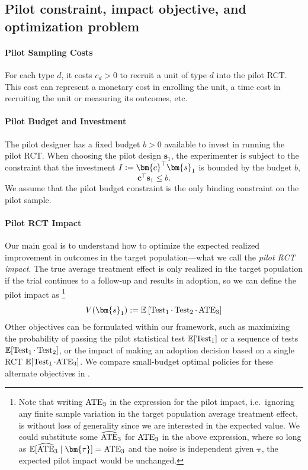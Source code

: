 \subsection{Pilot constraint, impact objective, and optimization problem}
\label{sec:pilot-budget-constraint-and-objective}

\paragraph{Pilot Sampling Costs}
For each type $d$, it costs $c_{d}>0$ to recruit a unit of type $d$ into the pilot RCT.
This cost can represent a monetary cost in enrolling the unit, a time cost in recruiting the unit or measuring its outcomes, etc.

\paragraph{Pilot Budget and Investment}
The pilot designer has a fixed budget $b > 0$ available to invest in running the pilot RCT.
When choosing the pilot design $\bm{s}_1$, the experimenter is subject to the constraint that the investment $I \defeq \bm{c}^{\top}\bm{s}_{1}$ is bounded by the budget $b$,
\[
  \bm{c}^{\top}\bm{s}_{1}\le b.
\]
We assume that the pilot budget constraint is the only binding constraint on the pilot sample.

\paragraph{Pilot RCT Impact}
Our main goal is to understand how to optimize the expected realized improvement in
outcomes in the target population---what we call the \emph{pilot RCT impact}.
The true average treatment effect is only realized in the target population if
the trial continues to a follow-up and results in adoption, so we can define the
pilot impact as%
\footnote{
  Note that writing $\mathrm{ATE}_3$ in the expression for the pilot impact, i.e.\ ignoring any finite sample variation in the target population average treatment effect, is without loss of generality since we are interested in the expected value.
  We could substitute some $\widehat{\mathrm{ATE}}_3$ for $\mathrm{ATE}_3$ in the above expression, where so long as $\E[\widehat{\ATE}_3\mid \bm{\tau}] = \ATE_3$ and the noise is independent given $\bm{\tau}$, the expected pilot impact would be unchanged.
}
\[
  V(\bm{s}_1) \defeq \E\left[
    \Test_1
    \cdot
    \Test_2
    \cdot\,
    \ATE_3
  \right]
\]
Other objectives can be formulated within our framework, such as maximizing the probability of passing the pilot statistical test $\mathbb{E}[\operatorname{Test}_1]$ or a sequence of tests $\mathbb{E}[\operatorname{Test}_1 \cdot \operatorname{Test}_2]$, or the impact of making an adoption decision based on a single RCT $\mathbb{E}[\operatorname{Test}_1 \cdot \mathrm{ATE}_3]$.
We compare small-budget optimal policies for these alternate objectives in .

